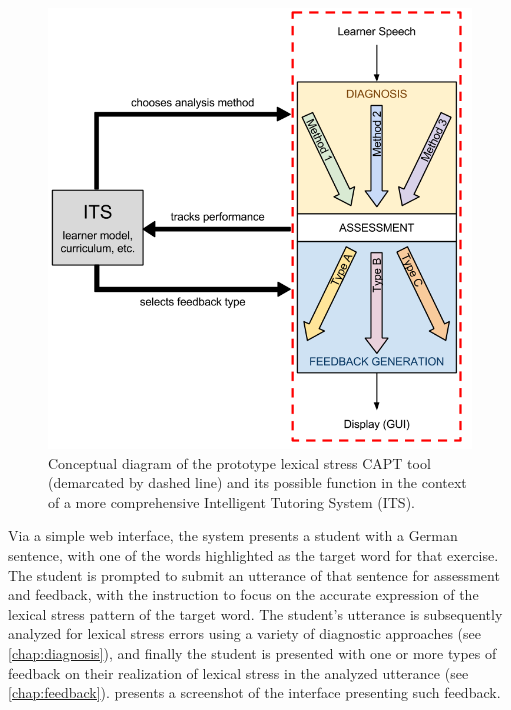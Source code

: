	\begin{figure}[tb] 
		\centering
		\includegraphics[height=.45\textheight]{img/hourglass-ITS} 
		\caption[Conceptual diagram of the prototype lexical stress CAPT tool]{Conceptual diagram of the prototype lexical stress CAPT tool (demarcated by dashed line) and its possible function in the context of a more comprehensive Intelligent Tutoring System (ITS).}
		\label{fig:hourglass-ITS}
	\end{figure}

 Via a simple web interface, the system presents a student with a German sentence,
 with one of the words highlighted as the target word for that exercise. The student is prompted to submit an utterance of that sentence for assessment and feedback, with the instruction to focus on the accurate expression of the lexical stress pattern of the target word. The student's utterance is subsequently analyzed for lexical stress errors using a variety of diagnostic approaches (see \cref{chap:diagnosis}), and finally the student is presented with one or more types of feedback on their realization of lexical stress in the analyzed utterance (see \cref{chap:feedback}).  presents a screenshot of the interface presenting such feedback.

